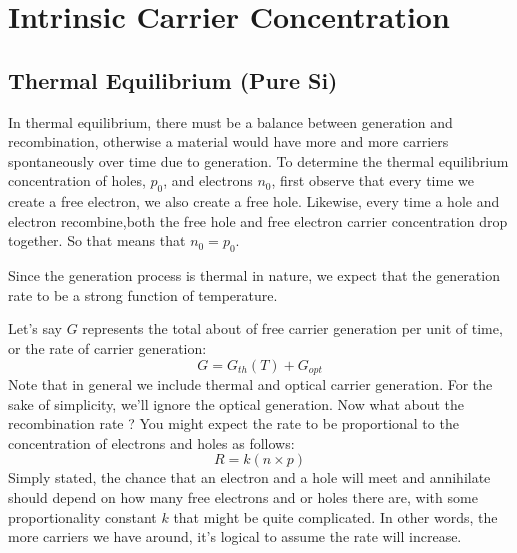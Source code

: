 \section{Intrinsic Carrier Concentration}




\subsection{Thermal Equilibrium (Pure Si)}




In thermal equilibrium, there must be a balance between generation and recombination, otherwise a material would have more and more carriers spontaneously over time due to generation.  To determine the thermal equilibrium concentration of holes, $p_0$, and electrons $n_0$, first observe that  every time we create a free electron, we also create a free hole.  Likewise, every time a hole and electron recombine,both the free hole and free electron carrier concentration drop together.  So that means that $n_0 =  p_0 $.


Since the generation process is thermal in nature, we expect that the generation rate to be a strong function of temperature.


Let’s say $G$ represents the total about of free carrier generation per unit of time, or the rate of carrier generation:
%
\begin{equation} G = {G_{th}}(T) + {G_{opt}} \end{equation}
%
Note that in general we include thermal and optical carrier generation.  For the sake of simplicity, we’ll ignore the optical generation.  Now what about the recombination rate ?  You might expect the rate to be proportional to the concentration of electrons and holes as follows:
%
\begin{equation} R = k(n \times p) \end{equation}
%
Simply stated, the chance that an electron and a hole will meet and annihilate should depend on how many free electrons and or holes there are, with some proportionality constant $k$ that might be quite complicated.  In other words, the more carriers we have around, it’s logical to assume the rate will increase. 


